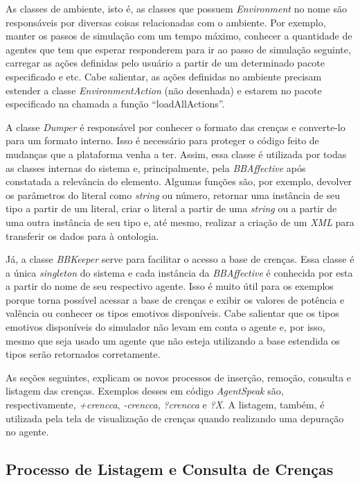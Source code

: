 As classes de ambiente, isto é, as classes que possuem \emph{Environment} no
nome são responsáveis por diversas coisas relacionadas com o ambiente. Por
exemplo, manter os passos de simulação com um tempo máximo, conhecer a
quantidade de agentes que tem que esperar responderem para ir ao passo de
simulação seguinte, carregar as ações definidas pelo usuário a partir de um
determinado pacote especificado e etc. Cabe salientar, as ações definidas no
ambiente precisam estender a classe \emph{EnvironmentAction} (não desenhada) e
estarem no pacote especificado na chamada a função ``loadAllActions''.

A classe \emph{Dumper} é responsável por conhecer o formato das crenças \jason
e converte-lo para um formato interno. Isso é necessário para proteger o
código feito de mudanças que a plataforma venha a ter. Assim, essa classe é
utilizada por todas as classes internas do sistema e, principalmente, pela
\emph{BBAffective} após constatada a relevância do elemento. Algumas funções
são, por exemplo, devolver os parâmetros do literal como \emph{string} ou número,
retornar uma instância de seu tipo a partir de um literal, criar o literal a
partir de uma \emph{string} ou a partir de uma outra instância de seu tipo e,
até mesmo, realizar a criação de um \emph{XML} para transferir os dados para
à ontologia.

Já, a classe \emph{BBKeeper} serve para facilitar o acesso a base de crenças.
Essa classe é a única \emph{singleton} do sistema e cada instância da
\emph{BBAffective} é conhecida por esta a partir do nome de seu respectivo
agente. Isso é muito útil para os exemplos porque torna possível acessar a
base de crenças e exibir os valores de potência e valência ou conhecer os
tipos emotivos disponíveis. Cabe salientar que os tipos emotivos disponíveis
do simulador não levam em conta o agente e, por isso, mesmo que seja usado um
agente que não esteja utilizando a base estendida os tipos serão retornados
corretamente.

As seções seguintes, explicam os novos processos de inserção, remoção,
consulta e listagem das crenças. Exemplos desses em código \emph{AgentSpeak}
são, respectivamente, \emph{+crencca}, \emph{-crencca}, \emph{?crencca} e
\emph{?X}. A listagem, também, é utilizada pela tela de visualização de
crenças quando realizando uma depuração no agente.

\subsection{Processo de Listagem e Consulta de Crenças}

